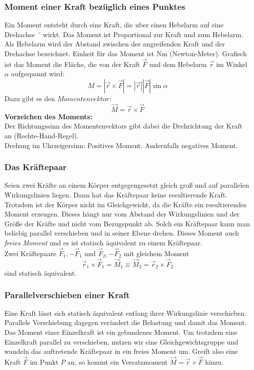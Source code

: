\documentclass[a4paper,parskip=half*,DIV=7,fontsize=11pt]{scrartcl}
\begin{document}
	\subsubsection{Moment einer Kraft bezüglich eines Punktes}
	Ein Moment entsteht durch eine Kraft, die uber einen Hebelarm auf eine Drehachse ¨
	wirkt. Das Moment ist Proportional zur Kraft und zum Hebelarm. Als Hebelarm wird
	der Abstand zwischen der angreifenden Kraft und der Drehachse bezeichnet. Einheit für das Moment ist Nm (Newton-Meter).
	Grafisch ist das Moment die Fläche, die von der Kraft $\overrightarrow{F}$ und dem Hebelarm $\overrightarrow{r}$ im Winkel $\alpha$ aufgespannt wird:
	$$M=|\overrightarrow{r} \times \overrightarrow{F}|=|\overrightarrow{r}||\overrightarrow{F}|\sin \alpha$$
	Dazu gibt es den $\textit{Momentenvektor}$:
	$$\overrightarrow{M}=\overrightarrow{r} \times \overrightarrow{F}$$
	\textbf{Vorzeichen des Moments:}\\
	Der Richtungssinn des Momentenvektors gibt dabei die Drehrichtung der Kraft an
	(Rechte-Hand-Regel).\\
	Drehung im Uhrzeigersinn: Positives Moment. Andernfalls negatives Moment.
	
	\subsubsection{Das Kräftepaar}
	Seien zwei Kräfte an einem Körper entgegengesetzt gleich groß und auf parallelen Wirkungslinien
	liegen. Dann hat das Kräftepaar keine resultierende Kraft. Trotzdem ist der
	Körper nicht im Gleichgewicht, da die Kräfte ein resultierendes Moment erzeugen. Dieses hängt nur vom Abstand der Wirkungslinien und der Größe der Kräfte und nicht vom Bezugspunkt ab. Solch ein Kräftepaar kann man beliebig parallel verschieben und in seiner Ebene drehen. Dieses Moment auch \textit{freies Moment} und es ist statisch äquivalent zu einem Kräftepaar.\\
	Zwei Kräftepaare $\overrightarrow{F}_1,-\overrightarrow{F}_1$ und $\overrightarrow{F}_2,-\overrightarrow{F}_2$ mit gleichem Moment
	$$\overrightarrow{r}_1 \times \overrightarrow{F}_1=\overrightarrow{M}_1 \equiv \overrightarrow{M}_2=\overrightarrow{r}_2 \times \overrightarrow{F}_2$$
	sind statisch äquivalent.
	
	\subsubsection{Parallelverschieben einer Kraft}
	Eine Kraft lässt sich statisch äquivalent entlang ihrer Wirkungslinie verschieben. Parallele Verschiebung dagegen verändert die Belastung und damit das Moment. Das Moment einer Einzelkraft ist ein gebundenes Moment. Um trotzdem eine Einzelkraft parallel zu verschieben, nutzen wir eine Gleichgewichtsgruppe und wandeln das auftretende Kräftepaar in ein freies Moment um. Greift also eine Kraft $\overrightarrow{F}$ im Punkt $P$ an, so kommt ein Versatzmoment $\overrightarrow{M}=\overrightarrow{r} \times \overrightarrow{F}$ hinzu.
	
\end{document}
